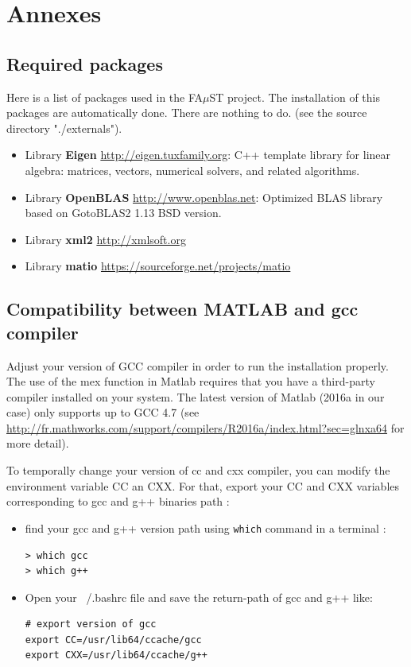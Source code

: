 \chapter{Annexes}\label{sec:Annexes}

\section{Required packages}\label{sec:ANNEXERequiredPackages}
Here is a list of packages used in the FA$\mu$ST project. The installation of this packages are automatically done. There are nothing to do. (see the source directory "./externals").
\begin{itemize}
\item Library \textbf{Eigen} \url{http://eigen.tuxfamily.org}: C++ template library for linear algebra: matrices, vectors, numerical solvers, and related algorithms.
\item Library \textbf{OpenBLAS} \url{http://www.openblas.net}:  Optimized BLAS library based on GotoBLAS2 1.13 BSD version.
\item Library \textbf{xml2} \url{http://xmlsoft.org}
\item Library \textbf{matio} \url{https://sourceforge.net/projects/matio}
\end{itemize}

\section{Compatibility between MATLAB and gcc compiler}\label{sec:ANNEXECompatibilityMatlabCompiler}
Adjust your version of GCC compiler in order to run the installation properly. The use of the mex function in Matlab requires that you have a third-party compiler installed on your system. The latest version of Matlab (2016a in our case) only supports up to GCC 4.7 (see \url{http://fr.mathworks.com/support/compilers/R2016a/index.html?sec=glnxa64} for more detail).

To temporally change your version of cc and cxx compiler, you can modify the environment variable CC an CXX. For that, export your CC and CXX variables corresponding to gcc and g++ binaries path :
\begin{itemize}
\item find your gcc and g++ version path using \texttt{which} command in a terminal :
\begin{lstlisting}
> which gcc
> which g++
\end{lstlisting}

\item Open your ~/.bashrc file and save the return-path of gcc and g++ like:
\begin{lstlisting}[backgroundcolor=\color{white}]
# export version of gcc
export CC=/usr/lib64/ccache/gcc
export CXX=/usr/lib64/ccache/g++
\end{lstlisting}
\end{itemize}



